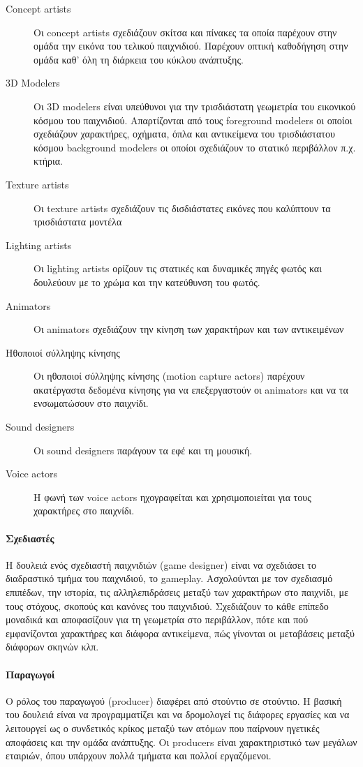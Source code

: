 	\begin{description}
		\item [Concept artists] 
		Οι concept artists σχεδιάζουν σκίτσα και πίνακες τα οποία παρέχουν στην ομάδα την εικόνα του τελικού παιχνιδιού. Παρέχουν οπτική καθοδήγηση στην ομάδα καθ' όλη τη διάρκεια του κύκλου ανάπτυξης.
		\item [3D Modelers]
	    Οι 3D modelers είναι υπεύθυνοι για την τρισδιάστατη γεωμετρία του εικονικού κόσμου του παιχνιδιού. Απαρτίζονται από τους
		foreground modelers οι οποίοι σχεδιάζουν χαρακτήρες, οχήματα, όπλα και αντικείμενα του τρισδιάστατου κόσμου
		background modelers οι οποίοι σχεδιάζουν το στατικό περιβάλλον π.χ. κτήρια.
		\item [Texture artists] Οι texture artists σχεδιάζουν τις δισδιάστατες εικόνες που καλύπτουν τα τρισδιάστατα μοντέλα
		\item [Lighting artists] Οι lighting artists ορίζουν τις στατικές και δυναμικές πηγές φωτός και δουλεύουν με το χρώμα και την κατεύθυνση του φωτός.
		\item [Animators] Οι animators σχεδιάζουν την κίνηση των χαρακτήρων και των αντικειμένων
		\item [Ηθοποιοί σύλληψης κίνησης] Οι ηθοποιοί σύλληψης κίνησης (motion capture actors) παρέχουν ακατέργαστα δεδομένα κίνησης για να επεξεργαστούν οι animators και να τα ενσωματώσουν στο παιχνίδι.
		\item [Sound designers] Οι sound designers παράγουν τα εφέ και τη μουσική.
		\item [Voice actors] H φωνή των voice actors ηχογραφείται και χρησιμοποιείται για τους χαρακτήρες στο παιχνίδι.
	\end{description}
	
	\paragraph{Σχεδιαστές}
	Η δουλειά ενός σχεδιαστή παιχνιδιών (game designer) είναι να σχεδιάσει το διαδραστικό τμήμα του παιχνιδιού, το gameplay. Ασχολούνται με τον σχεδιασμό επιπέδων, την ιστορία, τις αλληλεπιδράσεις μεταξύ των χαρακτήρων στο παιχνίδι, με τους στόχους, σκοπούς και κανόνες του παιχνιδιού.
	Σχεδιάζουν το κάθε επίπεδο μοναδικά και αποφασίζουν για τη γεωμετρία στο περιβάλλον, πότε και πού εμφανίζονται χαρακτήρες και διάφορα αντικείμενα, πώς γίνονται οι μεταβάσεις μεταξύ διάφορων σκηνών κλπ.
	
	\paragraph{Παραγωγοί}
	Ο ρόλος του παραγωγού (producer) διαφέρει από στούντιο σε στούντιο. Η βασική του δουλειά είναι να προγραμματίζει και να δρομολογεί τις διάφορες εργασίες και να λειτουργεί ως ο συνδετικός κρίκος μεταξύ των ατόμων που παίρνουν ηγετικές αποφάσεις και την ομάδα ανάπτυξης. Οι producers είναι χαρακτηριστικό των μεγάλων εταιριών, όπου υπάρχουν πολλά τμήματα και πολλοί εργαζόμενοι.	
	
